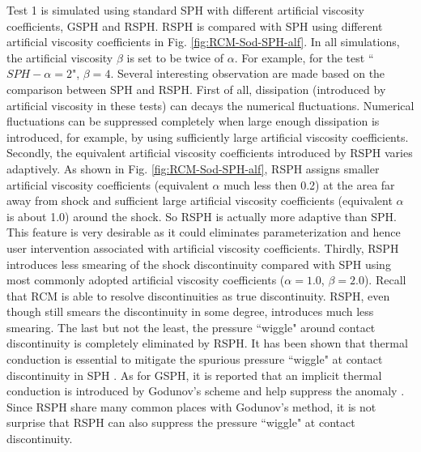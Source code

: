 \documentclass[review]{elsarticle}
\begin{document}
Test 1 is simulated using standard SPH with different artificial viscosity coefficients, GSPH and RSPH. RSPH is compared with SPH using different artificial viscosity coefficients in Fig. \ref{fig:RCM-Sod-SPH-alf}. In all simulations, the artificial viscosity $\beta$ is set to be twice of $\alpha$. For example, for the test ``$SPH-\alpha=2$", $\beta=4$. Several interesting observation are made based on the comparison between SPH and RSPH.
First of all, dissipation (introduced by artificial viscosity in these tests) can decays the numerical fluctuations. Numerical fluctuations can be suppressed completely when large enough dissipation is introduced, for example, by using sufficiently large artificial viscosity coefficients.
Secondly, the equivalent artificial viscosity coefficients introduced by RSPH varies adaptively.
As shown in Fig. \ref{fig:RCM-Sod-SPH-alf}, RSPH assigns smaller artificial viscosity coefficients (equivalent $\alpha$ much less then 0.2) at the area far away from shock and sufficient large artificial viscosity coefficients (equivalent $\alpha$ is about 1.0) around the shock. So RSPH is actually more adaptive than SPH. This feature is very desirable as it could eliminates parameterization and hence user intervention associated with artificial viscosity coefficients.
Thirdly, RSPH introduces less smearing of the shock discontinuity compared with SPH using most commonly adopted artificial viscosity coefficients ($\alpha=1.0$, $\beta=2.0$). Recall that RCM is able to resolve discontinuities as true discontinuity. RSPH, even though still smears the discontinuity in some degree, introduces much less smearing.
The last but not the least, the pressure ``wiggle" around contact discontinuity is completely eliminated by RSPH. It has been shown that thermal conduction is essential to mitigate the spurious pressure ``wiggle" at contact discontinuity in SPH \citep{monaghan1997sph, sigalotti2006shock, price2008modelling, price2012smoothed}. As for GSPH, it is reported that an implicit thermal conduction is introduced by Godunov's scheme and help suppress the anomaly \citep{puri2014approximate}. Since RSPH share many common places with Godunov's method, it is not surprise that RSPH can also suppress the pressure ``wiggle" at contact discontinuity.
\end{document}

